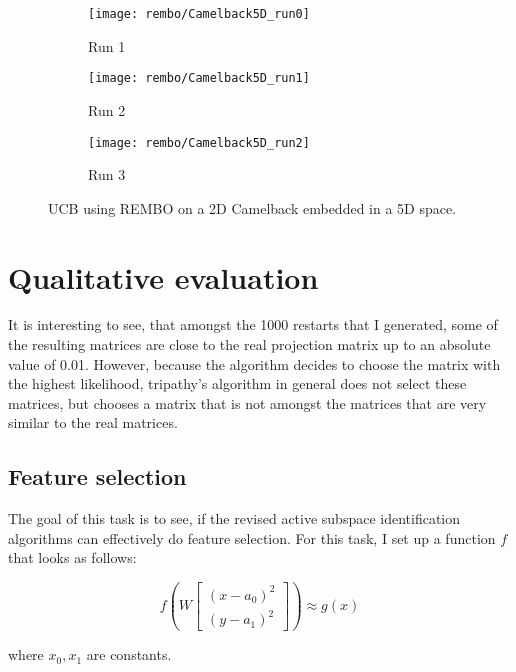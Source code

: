 \begin{figure}[H]
\center
    \begin{subfigure}[b]{0.30\textwidth}
        \texttt{[image: rembo/Camelback5D\_run0]}
        \label{fig:gull}
         \caption{Run 1}
    \end{subfigure}
        \begin{subfigure}[b]{0.30\textwidth}
        \texttt{[image: rembo/Camelback5D\_run1]}
        \label{fig:gull}
        \caption{Run 2}
    \end{subfigure}
    \begin{subfigure}[b]{0.30\textwidth}
        \texttt{[image: rembo/Camelback5D\_run2]}
        \label{fig:gull}
               \caption{Run 3}
    \end{subfigure}
        \caption{UCB using REMBO on a 2D Camelback embedded in a 5D space.
    }\label{fig:animals}
\end{figure}


\section{Qualitative evaluation}
It is interesting to see, that amongst the 1000 restarts that I generated, some of the resulting matrices are close to the real projection matrix up to an absolute value of 0.01.
However, because the algorithm decides to choose the matrix with the highest likelihood, tripathy's algorithm in general does not select these matrices, but chooses a matrix that is not amongst the matrices that are very similar to the real matrices.

\subsection{Feature selection}
The goal of this task is to see, if the revised active subspace identification algorithms can effectively do feature selection.
For this task, I set up a function $ f $ that looks as follows:

\def\B{
\begin{bmatrix}
    (x - a_0)^2 \\
    (y - a_1)^2
\end{bmatrix}}

\begin{equation} \label{eq:FeatureExtension}
f \left( W \B \right) \approx g \left( x \right)
\end{equation} 

where $x_0, x_1$ are constants. \\

